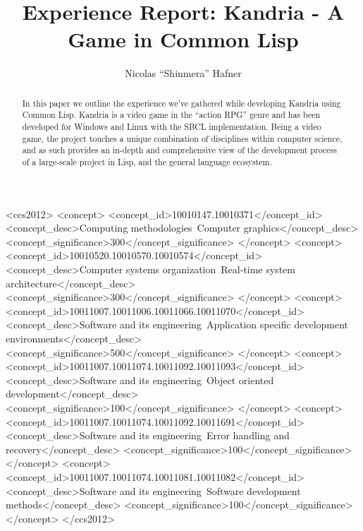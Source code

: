 \documentclass[format=sigconf]{acmart}
\begin{document}
\title{Experience Report: Kandria - A Game in Common Lisp}

\author{Nicolas ``Shinmera'' Hafner}

\begin{abstract}
  In this paper we outline the experience we've gathered while developing Kandria using Common Lisp. Kandria is a video game in the ``action RPG'' genre and has been developed for Windows and Linux with the SBCL implementation. Being a video game, the project touches a unique combination of disciplines within computer science, and as such provides an in-depth and comprehensive view of the development process of a large-scale project in Lisp, and the general language ecosystem.
\end{abstract}

\begin{CCSXML}
  <ccs2012>
  <concept>
  <concept_id>10010147.10010371</concept_id>
  <concept_desc>Computing methodologies~Computer graphics</concept_desc>
  <concept_significance>300</concept_significance>
  </concept>
  <concept>
  <concept_id>10010520.10010570.10010574</concept_id>
  <concept_desc>Computer systems organization~Real-time system architecture</concept_desc>
  <concept_significance>300</concept_significance>
  </concept>
  <concept>
  <concept_id>10011007.10011006.10011066.10011070</concept_id>
  <concept_desc>Software and its engineering~Application specific development environments</concept_desc>
  <concept_significance>500</concept_significance>
  </concept>
  <concept>
  <concept_id>10011007.10011074.10011092.10011093</concept_id>
  <concept_desc>Software and its engineering~Object oriented development</concept_desc>
  <concept_significance>100</concept_significance>
  </concept>
  <concept>
  <concept_id>10011007.10011074.10011092.10011691</concept_id>
  <concept_desc>Software and its engineering~Error handling and recovery</concept_desc>
  <concept_significance>100</concept_significance>
  </concept>
  <concept>
  <concept_id>10011007.10011074.10011081.10011082</concept_id>
  <concept_desc>Software and its engineering~Software development methods</concept_desc>
  <concept_significance>100</concept_significance>
  </concept>
  </ccs2012>
\end{CCSXML}

\end{document}
